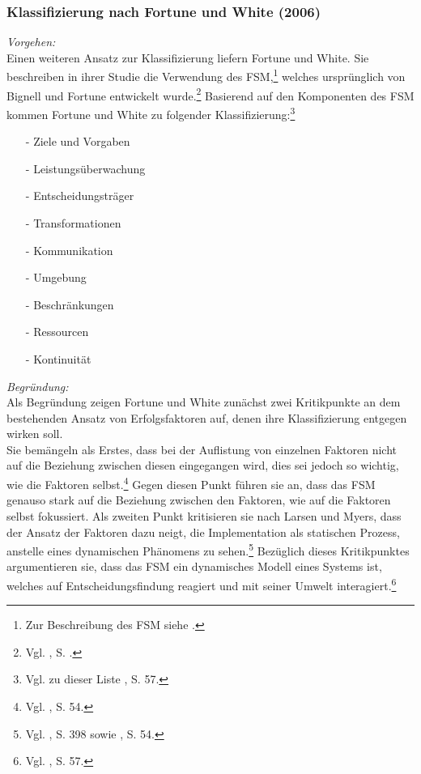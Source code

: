 \noindent
\subsubsection{Klassifizierung nach Fortune und White (2006)}
\textit{Vorgehen:}\\\noindent
Einen weiteren Ansatz zur Klassifizierung liefern Fortune und White. Sie beschreiben in ihrer Studie die Verwendung des 
\ac{FSM},\footnote{Zur Beschreibung des FSM siehe \cite{White.2009}.} welches ursprünglich von Bignell und Fortune entwickelt wurde.\footnote{Vgl. \cite{Fortune.2006}, S. .}
Basierend auf den Komponenten des \ac{FSM} kommen Fortune und White zu folgender Klassifizierung:\footnote{Vgl. zu dieser Liste \cite{Fortune.2006}, S. 57.}
\begin{itemize}\itemsep0pt
\item[-]{Ziele und Vorgaben}
\item[-]{Leistungsüberwachung}
\item[-]{Entscheidungsträger}
\item[-]{Transformationen}
\item[-]{Kommunikation}
\item[-]{Umgebung}
\item[-]{Beschränkungen}
\item[-]{Ressourcen}
\item[-]{Kontinuität}
\end{itemize}
\textit{Begründung:}\\\noindent
Als Begründung zeigen Fortune und White zunächst zwei Kritikpunkte an dem bestehenden Ansatz von Erfolgsfaktoren auf, denen ihre Klassifizierung entgegen wirken soll.\\\noindent
Sie bemängeln als Erstes, dass bei der Auflistung von einzelnen Faktoren nicht auf die Beziehung zwischen diesen eingegangen wird,
dies sei jedoch so wichtig, wie die Faktoren selbst.\footnote{Vgl. \cite{Fortune.2006}, S. 54.}
Gegen diesen Punkt führen sie an, dass das \ac{FSM} genauso stark auf die Beziehung zwischen den Faktoren, wie auf die Faktoren selbst fokussiert.
Als zweiten Punkt kritisieren sie nach Larsen und Myers, dass der Ansatz der Faktoren dazu neigt, die Implementation als
statischen Prozess, anstelle eines dynamischen Phänomens zu sehen.\footnote{Vgl. \cite{Larsen.1999}, S. 398 sowie \cite{Fortune.2006}, S. 54.}
Bezüglich dieses Kritikpunktes argumentieren sie, dass das \ac{FSM} ein dynamisches Modell eines Systems ist, welches auf Entscheidungsfindung reagiert und mit seiner
Umwelt interagiert.\footnote{Vgl. \cite{Fortune.2006}, S. 57.}
